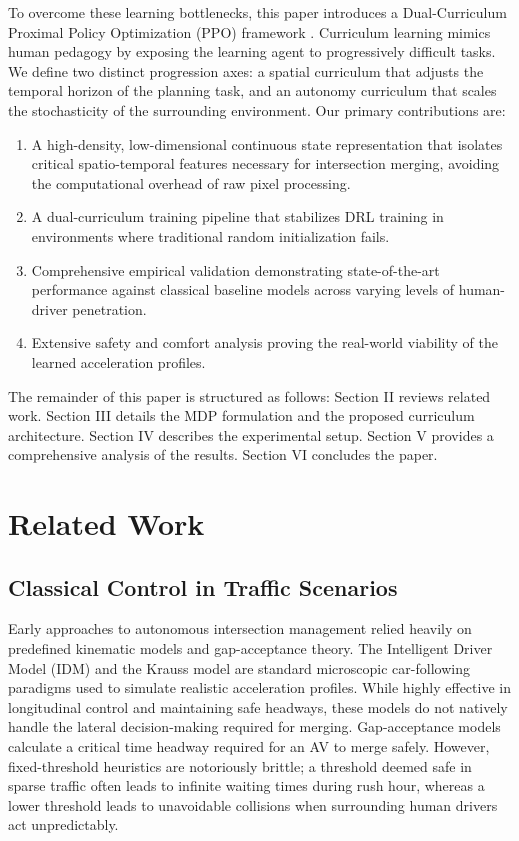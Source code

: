 \documentclass[conference]{IEEEtran}
\begin{document}
To overcome these learning bottlenecks, this paper introduces a Dual-Curriculum Proximal Policy Optimization (PPO) framework \cite{schulman2017proximal}. Curriculum learning \cite{bengio2009curriculum} mimics human pedagogy by exposing the learning agent to progressively difficult tasks. We define two distinct progression axes: a spatial curriculum that adjusts the temporal horizon of the planning task, and an autonomy curriculum that scales the stochasticity of the surrounding environment. Our primary contributions are:
\begin{enumerate}
    \item A high-density, low-dimensional continuous state representation that isolates critical spatio-temporal features necessary for intersection merging, avoiding the computational overhead of raw pixel processing.
    \item A dual-curriculum training pipeline that stabilizes DRL training in environments where traditional random initialization fails.
    \item Comprehensive empirical validation demonstrating state-of-the-art performance against classical baseline models across varying levels of human-driver penetration.
    \item Extensive safety and comfort analysis proving the real-world viability of the learned acceleration profiles.
\end{enumerate}

The remainder of this paper is structured as follows: Section II reviews related work. Section III details the MDP formulation and the proposed curriculum architecture. Section IV describes the experimental setup. Section V provides a comprehensive analysis of the results. Section VI concludes the paper.

\section{Related Work}
\subsection{Classical Control in Traffic Scenarios}
Early approaches to autonomous intersection management relied heavily on predefined kinematic models and gap-acceptance theory. The Intelligent Driver Model (IDM) \cite{treiber2000congested} and the Krauss model are standard microscopic car-following paradigms used to simulate realistic acceleration profiles. While highly effective in longitudinal control and maintaining safe headways, these models do not natively handle the lateral decision-making required for merging. Gap-acceptance models \cite{troutbeck1999limited} calculate a critical time headway required for an AV to merge safely. However, fixed-threshold heuristics are notoriously brittle; a threshold deemed safe in sparse traffic often leads to infinite waiting times during rush hour, whereas a lower threshold leads to unavoidable collisions when surrounding human drivers act unpredictably. 
\end{document}
